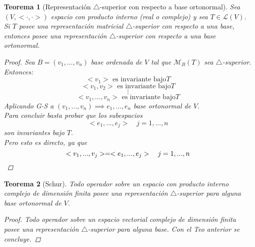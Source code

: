 \documentclass[11pt]{book}
\newtheorem{thm}{Teorema}[section]
\theoremstyle{definition}
\begin{document}
\begin{thm}[Representación $\triangle$-superior con respecto a base ortonormal]
	Sea $(V,<\cdot,\cdot>)$ espacio con producto interno (real o complejo) y sea $T\in\mathcal{L}(V)$. Si $T$ posee una representación matricial $\triangle$-superior con respecto a una base, entonces posee una representación $\triangle$-superior con respecto a una base ortonormal.
	\begin{proof}
		Sea $B=(v_1,...,v_n)$ base ordenada de $V$ tal que $\mathcal{M}_B(T)$ sea $\triangle$-superior. Entonces:
		\[<v_1>\textrm{ es invariante bajo} T\]
		\[<v_1,v_2>\textrm{ es invariante bajo} T\]
		\[\vdots\]
		\[<v_1,...,v_n>\textrm{ es invariante bajo} T\]
		Aplicando G-S a $(v_1,...,v_n)\implies e_1,...,e_n$ base ortonormal de $V$.\\
		Para concluir basta probar que los subespacios
		\[<e_1,...,e_j>\quad j=1,...,n\]
		son invariantes bajo $T$.\\
		Pero esto es directo, ya que
		\[<v_1,...,v_j>=<e_1,...,e_j>\quad j=1,...,n\qedhere\]
	\end{proof}
\end{thm}
\begin{thm}[Schur]
	Todo operador sobre un espacio con producto interno complejo de dimensión finita posee una representación $\triangle$-superior para alguna base ortonormal de $V$.
	\begin{proof}
		Todo operador sobre un espacio vectorial complejo de dimensión finita posee una representación $\triangle$-superior para alguna base. Con el Teo anterior se concluye.
	\end{proof}
\end{thm}
\end{document}
